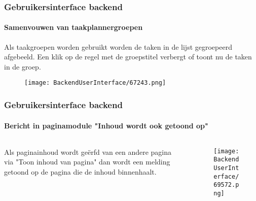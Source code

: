 \begin{frame}[fragile]
	\frametitle{Gebruikersinterface backend}
	\framesubtitle{Samenvouwen van taakplannergroepen}

	Als taakgroepen worden gebruikt worden de taken in de lijst gegroepeerd afgebeeld.
	Een klik op de regel met de groepstitel verbergt of toont nu de taken in de groep.

	\begin{figure}\vspace{-0.3cm}
		\texttt{[image: BackendUserInterface/67243.png]}
	\end{figure}

\end{frame}

\begin{frame}[fragile]
	\frametitle{Gebruikersinterface backend}
	\framesubtitle{Bericht in paginamodule "Inhoud wordt ook getoond op"}

	\begin{columns}[T]
		\begin{column}{.3\textwidth}
			Als paginainhoud wordt geërfd van een andere pagina via "Toon inhoud van pagina"
			dan wordt een melding getoond op de pagina die de inhoud binnenhaalt.
		\end{column}

		\begin{column}{.7\textwidth}
			\begin{figure}\vspace*{-0.6cm}
				\texttt{[image: BackendUserInterface/69572.png]}
			\end{figure}
		\end{column}
	\end{columns}

\end{frame}

